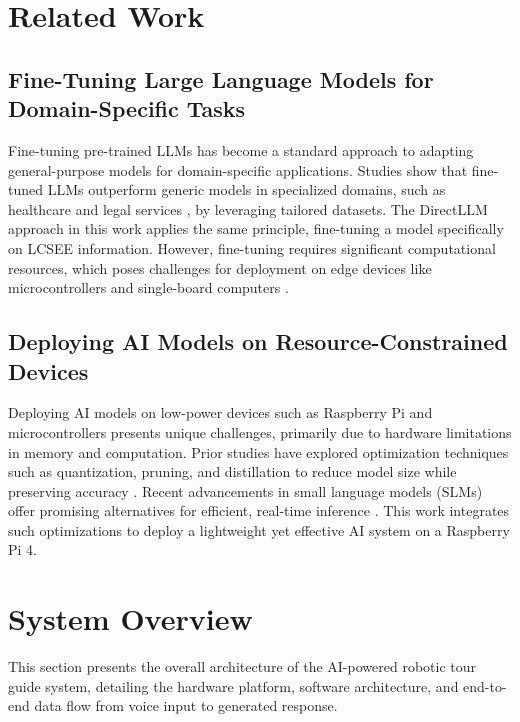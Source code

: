 \documentclass[conference]{IEEEtran}
\begin{document}
\section{Related Work}
\subsection{Fine-Tuning Large Language Models for Domain-Specific Tasks}
Fine-tuning pre-trained LLMs has become a standard approach to adapting general-purpose models for domain-specific applications. 
Studies show that fine-tuned LLMs outperform generic models in specialized domains, such as healthcare and legal services \cite{b2}, by leveraging tailored datasets. 
The DirectLLM approach in this work applies the same principle, fine-tuning a model specifically on LCSEE information. 
However, fine-tuning requires significant computational resources, which poses challenges for deployment on edge devices like microcontrollers and single-board computers \cite{b3}.

\subsection{Deploying AI Models on Resource-Constrained Devices}
Deploying AI models on low-power devices such as Raspberry Pi and microcontrollers presents unique challenges, primarily due to hardware limitations in memory and computation. 
Prior studies have explored optimization techniques such as quantization, pruning, and distillation to reduce model size while preserving accuracy \cite{b4}. 
Recent advancements in small language models (SLMs) offer promising alternatives for efficient, real-time inference \cite{b5}. 
This work integrates such optimizations to deploy a lightweight yet effective AI system on a Raspberry Pi 4.

\section{System Overview}
This section presents the overall architecture of the AI-powered robotic tour guide system, detailing the hardware platform,
software architecture, and end-to-end data flow from voice input to generated response.

\end{document}
